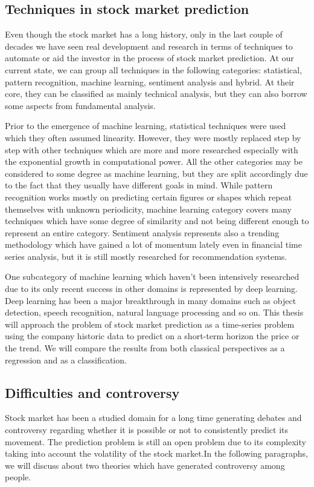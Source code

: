 \subsection{Techniques in stock market prediction}
Even though the stock market has a long history, only in the last couple of decades we have seen real development and research in terms of techniques to automate or aid the investor in the process of stock market prediction. At our current state, we can group all techniques in the following categories: statistical, pattern recognition, machine learning, sentiment analysis and hybrid.\cite{shah2019stock} At their core, they can be classified as mainly technical analysis, but they can also borrow some aspects from fundamental analysis.

Prior to the emergence of machine learning, statistical techniques were used which they often assumed linearity. However, they were mostly replaced step by step with other techniques which are more and more researched especially with the exponential growth in computational power. All the other categories may be considered to some degree as machine learning, but they are split accordingly due to the fact that they usually have different goals in mind. While pattern recognition works mostly on predicting certain figures or shapes which repeat themselves with unknown periodicity, machine learning category covers many techniques which have some degree of similarity and not being different enough to represent an entire category. Sentiment analysis represents also a trending methodology which have gained a lot of momentum lately even in financial time series analysis, but it is still mostly researched for recommendation systems.

One subcategory of machine learning which haven't been intensively researched due to its only recent success in other domains is represented by deep learning. Deep learning has been a major breakthrough in many domains such as object detection, speech recognition, natural language processing and so on. This thesis will approach the problem of stock market prediction as a time-series problem using the company historic data to predict on a short-term horizon the price or the trend. We will compare the results from both classical perspectives as a regression and as a classification.

\subsection{Difficulties and controversy}
Stock market has been a studied domain for a long time generating debates and controversy regarding whether it is possible or not to consistently predict its movement. The prediction problem is still an open problem due to its complexity taking into account the volatility of the stock market.In the following paragraphs, we will discuss about two theories which have generated controversy among people.

